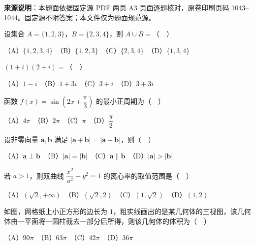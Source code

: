 


\begin{gktip}
\textbf{来源说明}：本题面依据固定源 PDF 两页 A3 页面逐题核对，原卷印刷页码 1043–1044。固定源不附答案；本文件仅为题面规范源。
\end{gktip}


\begin{question}
设集合 \(A=\{1,2,3\}\)，\(B=\{2,3,4\}\)，则 \(A\cup B=\)（　）

（A）\(\{1,2,3,4\}\)　（B）\(\{1,2,3\}\)　（C）\(\{2,3,4\}\)　（D）\(\{1,3,4\}\)

\end{question}
\begin{question}
\((1+i)(2+i)=\)（　）

（A）\(1-i\)　（B）\(1+3i\)　（C）\(3+i\)　（D）\(3+3i\)

\end{question}
\begin{question}
函数 \(f(x)=\sin\left(2x+\dfrac{\pi}{3}\right)\) 的最小正周期为（　）

（A）\(4\pi\)　（B）\(2\pi\)　（C）\(\pi\)　（D）\(\dfrac{\pi}{2}\)

\end{question}
\begin{question}
设非零向量 \(\boldsymbol a,\boldsymbol b\) 满足 \(|\boldsymbol a+\boldsymbol b|=|\boldsymbol a-\boldsymbol b|\)，则（　）

（A）\(\boldsymbol a\perp\boldsymbol b\)　（B）\(|\boldsymbol a|=|\boldsymbol b|\)　（C）\(\boldsymbol a\parallel\boldsymbol b\)　（D）\(|\boldsymbol a|>|\boldsymbol b|\)

\end{question}
\begin{question}
若 \(a>1\)，则双曲线 \(\dfrac{x^2}{a^2}-y^2=1\) 的离心率的取值范围是（　）

（A）\((\sqrt2,+\infty)\)　（B）\((\sqrt2,2)\)　（C）\((1,\sqrt2)\)　（D）\((1,2)\)

\Needspace{0.4\textheight}
\end{question}
\begin{question}
如图，网格纸上小正方形的边长为 \(1\)，粗实线画出的是某几何体的三视图，该几何体由一平面将一圆柱截去一部分后所得，则该几何体的体积为（　）
\nopagebreak[4]
\begin{center}\end{center}
\nopagebreak[4]
（A）\(90\pi\)　（B）\(63\pi\)　（C）\(42\pi\)　（D）\(36\pi\)

\end{question}

